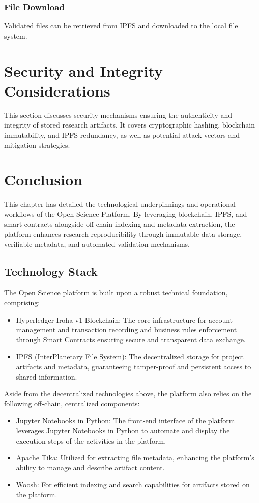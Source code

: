 \documentclass{article}
\begin{document}
\subsubsection{File Download}
Validated files can be retrieved from IPFS and downloaded to the local file system.

\section{Security and Integrity Considerations}
This section discusses security mechanisms ensuring the authenticity and integrity of stored research artifacts. It covers cryptographic hashing, blockchain immutability, and IPFS redundancy, as well as potential attack vectors and mitigation strategies.

\section{Conclusion}
This chapter has detailed the technological underpinnings and operational workflows of the Open Science Platform. By leveraging blockchain, IPFS, and smart contracts alongside off-chain indexing and metadata extraction, the platform enhances research reproducibility through immutable data storage, verifiable metadata, and automated validation mechanisms.



\subsection{Technology Stack}

The Open Science platform is built upon a robust technical foundation, comprising:

\begin{itemize}
      \item Hyperledger Iroha v1 Blockchain: The core infrastructure for account management and transaction recording and business rules enforcement through Smart Contracts ensuring secure and transparent data exchange.
      \item IPFS (InterPlanetary File System): The decentralized storage for project artifacts and metadata, guaranteeing tamper-proof and persistent access to shared information.
\end{itemize}


Aside from the decentralized technologies above, the platform also relies on the following off-chain, centralized components:

\begin{itemize}
      \item Jupyter Notebooks in Python: The front-end interface of the platform leverages Jupyter Notebooks in Python to automate and display the execution steps of the activities in the platform.
      \item Apache Tika: Utilized for extracting file metadata, enhancing the platform's ability to manage and describe artifact content.
      \item Woosh: For efficient indexing and search capabilities for artifacts stored on the platform.
\end{itemize}
\end{document}
